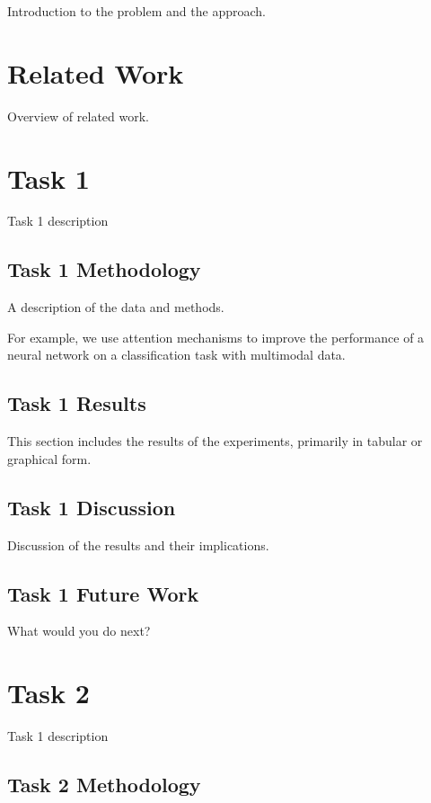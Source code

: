 \documentclass[]{style/ceurart}
\begin{document}
Introduction to the problem and the approach.

\section{Related Work}

Overview of related work.

\section{Task 1}

Task 1 description


\subsection{Task 1 Methodology}

A description of the data and methods.

For example, we use attention mechanisms \cite{vaswani2017attention} to improve the performance of a neural network on a classification task with multimodal data.

\subsection{Task 1 Results}

This section includes the results of the experiments, primarily in tabular or graphical form.

\subsection{Task 1 Discussion}

Discussion of the results and their implications.

\subsection{Task 1 Future Work}

What would you do next?


\section{Task 2}

Task 1 description


\subsection{Task 2 Methodology}
\end{document}
